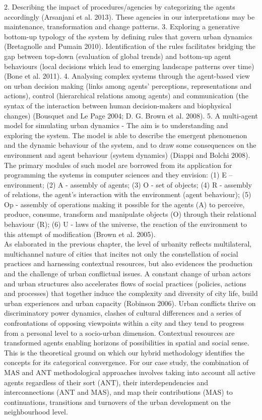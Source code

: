 \documentclass[11pt]{report}
\begin{document}
2.	Describing the impact of procedures/agencies by categorizing the agents accordingly (Arsanjani et al. 2013). These agencies in our interpretations may be maintenance, transformation and change patterns.
3.	Exploring a generative bottom-up typology of the system by defining rules that govern urban dynamics (Bretagnolle and Pumain 2010). Identification of the rules facilitates bridging the gap between top-down (evaluation of global trends) and bottom-up agent behaviours (local decisions which lead to emerging landscape patterns over time) (Bone et al. 2011). 
4.	Analysing complex systems through the agent-based view on urban decision making (links among agents' perceptions, representations and actions), control (hierarchical relations among agents) and communication (the syntax of the interaction between human decision-makers and biophysical changes) (Bousquet and Le Page 2004; D. G. Brown et al. 2008).
5.	A multi-agent model for simulating urban dynamics - The aim is to understanding and exploring the system. The model is able to describe the emergent phenomenon and the dynamic behaviour of the system,  and to draw some consequences on the environment and agent behaviour (system dynamics) (Diappi and Bolchi 2008). The primary modules of such model are borrowed from its application for programming the systems in computer sciences and they envision: (1) E – environment; (2)  A - assembly of agents; (3) O - set of objects; (4) R - assembly of relations, the agent’s interaction with the environment (agent behaviour); (5) Op - assembly of operations making it possible for the agents (A) to perceive, produce, consume, transform and manipulate objects (O) through their relational behaviour (R); (6) U - laws of the universe, the reaction  of  the  environment  to  this  attempt  of  modification (Brown et al. 2005).
\\ 
As elaborated in the previous chapter, the level of urbanity reflects multilateral, multichannel  nature of cities that incites not only the constellation of social practices and harnessing contextual resources, but also evidences the production and the challenge of urban conflictual issues. A constant change of urban actors and urban structures also accelerates flows of social practices (policies, actions and processes) that together induce the complexity and diversity of city life, build urban experiences and urban capacity (Robinson 2006). Urban conflicts thrive on discriminatory power dynamics, clashes of cultural differences and a series of confrontations of opposing viewpoints within a city and they tend to progress from a personal level to a socio-urban dimension. Contextual resources are transformed agents enabling horizons of possibilities in spatial and social sense.
\\
This is the theoretical ground on which our hybrid methodology identifies the concepts for its categorical convergence. For our case study, the combination of MAS and ANT methodological approaches involves taking into account all active agents regardless of their sort (ANT), their interdependencies and interconnections (ANT and MAS), and map their contributions (MAS) to continuations, transitions and turnovers of the urban development on the neighbourhood level.
\end{document}
